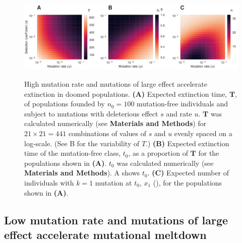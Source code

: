 \documentclass[9pt,lineno]{elife}
\begin{document}
\begin{figure}[ht!]
\includegraphics[width=\linewidth]{heat.pdf}
\caption{High mutation rate and mutations of large effect accelerate extinction in doomed populations.  
%
\textbf{(A)} Expected extinction time, $\mathbf{T}$, of populations founded by $n_0=100$ mutation-free individuals and subject to mutations with deleterious effect $s$ and rate $u$.  $\mathbf{T}$ was calculated numerically (see \textbf{Materials and Methods}) for $21\times21=441$ combinations of values of $s$ and $u$ evenly spaced on a log-scale.  (See B for the variability of $T$.)
%
\textbf{(B)} Expected extinction time of the mutation-free class, $t_0$, as a proportion of $\mathbf{T}$ for the populations shown in \textbf{(A)}.  
$t_0$ was calculated numerically (see \textbf{Materials and Methods}).
A shows $t_0$.
%
\textbf{(C)} Expected number of individuals with $k=1$ mutation at $t_0$, $x_1$ (), for the populations shown in \textbf{(A)}.
}
\label{fig:heat}
\label{figsupp:sf3}
\end{figure}


\subsection{Low mutation rate and mutations of large effect accelerate mutational meltdown}
\end{document}
